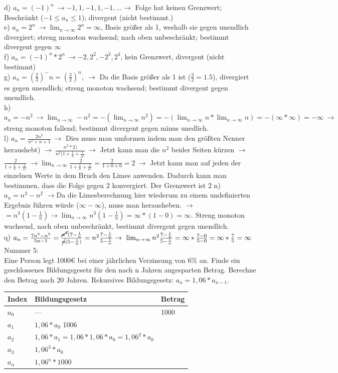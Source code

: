 \documentclass{article}
\newcommand{\tto}{\ensuremath{\to}}
\begin{document}
	d) $a_n=(-1)^n\ \to -1, 1, -1, 1, -1, ... \to$ Folge hat keinen Grenzwert; Beschränkt ($-1\leq a_n \leq 1$); divergent (nicht bestimmt.) \\
	e) $a_n=2^n\ \to \lim_{n\to\infty}2^n=\infty$, Basis größer als 1, weshalb sie gegen unendlich divergiert; streng monoton wachsend; nach oben unbeschränkt; bestimmt divergent gegen $\infty$ \\
	f) $a_n=(-1)^n*2^n\ \to -2, 2^2, -2^3, 2^4$, kein Grenzwert, divergent (nicht bestimmt) \\
	g) $a_n=(\frac{2}{3})^-n=(\frac{3}{2})^n,\ \to$ Da die Basis größer als 1 ist ($\frac{3}{2}=1.5$), divergiert es gegen unendlich; streng monoton wachsend; bestimmt divergent gegen unendlich. \\
	h) $a_n=-n^2\ \to \lim_{n\to\infty}-n^2=-(\lim_{n\to\infty}n^2)=-(\lim_{n\to\infty}n*\lim_{n\to\infty}n)=-(\infty*\infty)=-\infty\ \to$ streng monoton fallend; bestimmt divergent gegen minus unedlich. \\
	l) $a_n=\frac{2n^2}{n^2+n+1}\ \to$ Dies muss man umformen indem man den größten Nenner heraushebt) $\to\ \frac{n^2*2)}{n^2(1+\frac{1}{n}+\frac{1}{n^2}}\ \to$ Jetzt kann man die $n^2$ beider Seiten kürzen $\to$ \\
	$\frac{2}{1+\frac{1}{n}+\frac{1}{n^2}}\ \to \lim_{n\to\infty}\frac{2}{1+\frac{1}{n}+\frac{1}{n^2}}=\frac{2}{1+0+0}=2\ \to$ Jetzt kann man auf jeden der einzelnen Werte in dem Bruch den Limes anwenden. Dadurch kann man bestimmen, dass die Folge gegen 2 konvergiert. Der Grenzwert ist 2
	n) $a_n=n^3-n^2$ \tto Da die Limesberechnung hier wiederum zu einem undefinierten Ergebnis führen würde ($\infty -\infty$), muss man herausheben. \tto $=n^3(1-\frac{1}{n})\to \lim_{n\to\infty}n^3(1-\frac{1}{n})=\infty*(1-0)=\infty$. Streng monoton wachsend, nach oben unbeschränkt, bestimmt divergent gegen unendlich. \\
	q) $a_n=\frac{7n^3-n^2}{5n-1}=\frac{\cancel{n^3}(7-\frac{1}{n}}{\cancel{n}(5-\frac{1}{n})}=n^2\frac{7-\frac{1}{n}}{5-\frac{1}{n}}\to\ \lim_{n\to\infty}n^2\frac{7-\frac{1}{n}}{5-\frac{1}{n}}=\infty*\frac{7-0}{5-0}=\infty*\frac{7}{5}=\infty$\\
	Nummer 5: \\
	Eine Person legt 1000€ bei einer jährlichen Verzinsung von 6\% an. Finde ein geschlossenes Bildungsgesetz für den nach n Jahren angesparten Betrag. Berechne den Betrag nach 20 Jahren. Rekursives Bildungsgesetz: $a_n=1,06*a_{n-1}$. \\
	\begin{tabular}{| l | l | l |}
		\toprule
		Index & Bildungsgesetz & Betrag \\ \midrule
		$a_0$ & --- & 1000 \\ \hline
		$a_1$ & $1,06*a_0$ 1006 \\ \hline
		$a_2$ & $1,06*a_1=1,06*1,06*a_0=1,06^2*a_0$ & \\ \hline
		$a_3$ & $1,06^3*a_0$ & \\ \hline
		$a_n$ & $1,06^n*1000$ & \\
		\bottomrule
	\end{tabular} \\
\end{document}

